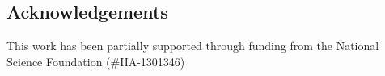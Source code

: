 \documentclass[final]{beamer}
\begin{document}
\begin{frame}[t]
\begin{multicols}{2}


\subsection{Acknowledgements}

This work has been partially supported through funding from the National
Science Foundation (\#IIA-1301346)







\end{multicols}

\end{frame}
\end{document}
